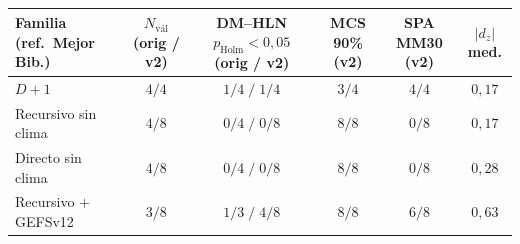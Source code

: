 \scriptsize
\setlength{\tabcolsep}{2.2pt}
\begin{tabular}{@{}lccccc@{}}
\toprule
Familia (ref.\ Mejor Bib.) & $N_{\text{vál}}$ (orig / v2) & DM--HLN $p_{\text{Holm}}<0{,}05$ (orig / v2) & MCS 90\% (v2) & SPA MM30 (v2) & $|d_z|$ med. \\
\midrule
$D+1$ & $4 / 4$ & $1/4 \;/\; 1/4$ & $3/4$ & $4/4$ & $0{,}17$ \\
Recursivo sin clima & $4 / 8$ & $0/4 \;/\; 0/8$ & $8/8$ & $0/8$ & $0{,}17$ \\
Directo sin clima & $4 / 8$ & $0/4 \;/\; 0/8$ & $8/8$ & $0/8$ & $0{,}28$ \\
Recursivo + GEFSv12 & $3 / 8$ & $1/3 \;/\; 4/8$ & $8/8$ & $6/8$ & $0{,}63$ \\
\bottomrule
\end{tabular}

